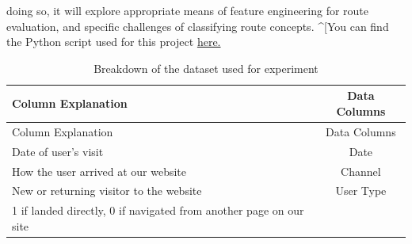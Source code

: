 \documentclass[12pt,oneside]{dukestatscithesis}
\theoremstyle{definition}
\theoremstyle{definition}
\theoremstyle{definition}
\theoremstyle{remark}
\begin{document}
doing so, it will explore appropriate means of feature engineering for
route evaluation, and specific challenges of classifying route concepts.
\^{}{[}You can find the Python script used for this project
\href{https://github.com/akozlu/NFLModel}{here.}
\begin{longtable}[]{@{}lc@{}}
\caption{\label{tab:datasetbreakdown} Breakdown of the dataset used for
experiment}\tabularnewline
\toprule
\begin{minipage}[b]{0.60\columnwidth}\raggedright\strut
Column Explanation\strut
\end{minipage} & \begin{minipage}[b]{0.24\columnwidth}\centering\strut
Data Columns\strut
\end{minipage}\tabularnewline
\midrule
\endfirsthead
\toprule
\begin{minipage}[b]{0.60\columnwidth}\raggedright\strut
Column Explanation\strut
\end{minipage} & \begin{minipage}[b]{0.24\columnwidth}\centering\strut
Data Columns\strut
\end{minipage}\tabularnewline
\midrule
\endhead
\begin{minipage}[t]{0.60\columnwidth}\raggedright\strut
Date of user's visit\strut
\end{minipage} & \begin{minipage}[t]{0.24\columnwidth}\centering\strut
Date\strut
\end{minipage}\tabularnewline
\begin{minipage}[t]{0.60\columnwidth}\raggedright\strut
How the user arrived at our website\strut
\end{minipage} & \begin{minipage}[t]{0.24\columnwidth}\centering\strut
Channel\strut
\end{minipage}\tabularnewline
\begin{minipage}[t]{0.60\columnwidth}\raggedright\strut
New or returning visitor to the website\strut
\end{minipage} & \begin{minipage}[t]{0.24\columnwidth}\centering\strut
User Type\strut
\end{minipage}\tabularnewline
\begin{minipage}[t]{0.60\columnwidth}\raggedright\strut
1 if landed directly, 0 if navigated from another page on our site\strut
\end{minipage} & \begin{minipage}[t]{0.24\columnwidth}\centering\strut

\end{minipage}
\end{longtable}
\end{document}
